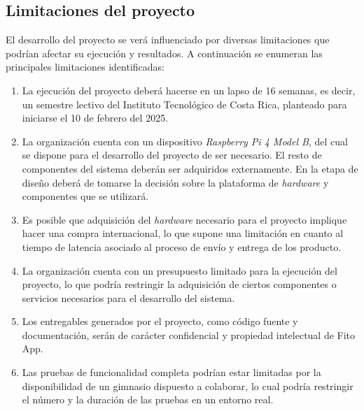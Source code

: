 \subsection{Limitaciones del proyecto}
El desarrollo del proyecto se verá influenciado por diversas limitaciones que podrían afectar su ejecución y resultados. A continuación se enumeran las principales limitaciones identificadas:

\begin{enumerate}
    \item La ejecución del proyecto deberá hacerse en un lapso de 16 semanas, es decir, un semestre lectivo del Instituto Tecnológico de Costa Rica, planteado para iniciarse el 10 de febrero del 2025.
    \item La organización cuenta con un dispositivo \textit{Raspberry Pi 4 Model B}, del cual se dispone para el desarrollo del proyecto de ser necesario. El resto de componentes del sistema deberán ser adquiridos externamente. En la etapa de diseño deberá de tomarse la decisión sobre la plataforma de \textit{hardware} y componentes que se utilizará.
    \item Es posible que adquisición del \textit{hardware} necesario para el proyecto implique hacer una compra internacional, lo que supone una limitación en cuanto al tiempo de latencia asociado al proceso de envío y entrega de los producto.
    \item La organización cuenta con un presupuesto limitado para la ejecución del proyecto, lo que podría restringir la adquisición de ciertos componentes o servicios necesarios para el desarrollo del sistema.
    \item Los entregables generados por el proyecto, como código fuente y documentación, serán de carácter confidencial y propiedad intelectual de Fito App.
    \item Las pruebas de funcionalidad completa podrían estar limitadas por la disponibilidad de un gimnasio dispuesto a colaborar, lo cual podría restringir el número y la duración de las pruebas en un entorno real.
\end{enumerate}



